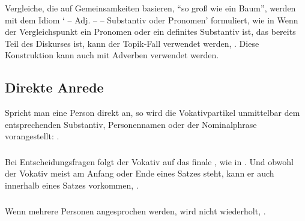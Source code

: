 \subsubsection{} Vergleiche, die auf Gemeinsamkeiten basieren, ``so groß wie ein Baum'', werden mit dem Idiom ` -- Adj. --  -- Substantiv oder Pronomen' formuliert, wie in   Wenn der Vergleichspunkt ein Pronomen oder ein definites Substantiv ist, das bereits Teil des Diskurses ist, kann der Topik-Fall verwendet werden, . Diese Konstruktion kann auch mit Adverben verwendet werden. \label{syntax:adj-eql-comp}


\subsection{Direkte Anrede}
Spricht man eine Person direkt an, so wird die Vokativpartikel  unmittelbar dem entsprechenden Substantiv, Personennamen oder der Nominalphrase vorangestellt:    .

\subsubsection{} Bei Entscheidungsfragen folgt der Vokativ auf das finale , wie in  . Und obwohl der Vokativ meist am Anfang oder Ende eines Satzes steht, kann er auch innerhalb eines Satzes vorkommen,  .

\subsubsection{} Wenn mehrere Personen angesprochen werden, wird  nicht wiederholt,  .

